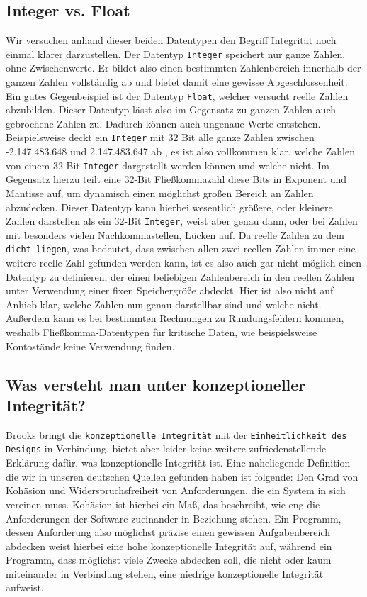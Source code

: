 \documentclass[a4paper, ngerman, 12pt, usenames, dvipsnames]{article}
\begin{document}
\subsection{Integer vs. Float}
Wir versuchen anhand dieser beiden Datentypen den Begriff Integrität noch einmal klarer darzustellen. Der Datentyp \texttt{Integer} speichert nur ganze Zahlen, ohne Zwischenwerte. Er bildet also einen bestimmten Zahlenbereich innerhalb der ganzen Zahlen vollständig ab und bietet damit eine gewisse Abgeschlossenheit. Ein gutes Gegenbeispiel ist der Datentyp \texttt{Float}, welcher versucht reelle Zahlen abzubilden. Dieser Datentyp lässt also im Gegensatz zu ganzen Zahlen auch gebrochene Zahlen zu. Dadurch können auch ungenaue Werte entstehen. Beispielsweise deckt ein \texttt{Integer} mit 32 Bit alle ganze Zahlen zwischen -2.147.483.648 und 2.147.483.647 ab \cite{dewiki:integer}, es ist also vollkommen klar, welche Zahlen von einem 32-Bit \texttt{Integer} dargestellt werden können und welche nicht. Im Gegensatz hierzu teilt eine 32-Bit Fließkommazahl diese Bits in Exponent und Mantisse auf, um dynamisch einen möglichst großen Bereich an Zahlen abzudecken. Dieser Datentyp kann hierbei wesentlich größere, oder kleinere Zahlen darstellen als ein 32-Bit \texttt{Integer}, weist aber genau dann, oder bei Zahlen mit besonders vielen Nachkommastellen, Lücken auf. \cite{dewiki:float} Da reelle Zahlen zu dem \texttt{dicht liegen}, was bedeutet, dass zwischen allen zwei reellen Zahlen immer eine weitere reelle Zahl gefunden werden kann, ist es also auch gar nicht möglich einen Datentyp zu definieren, der einen beliebigen Zahlenbereich in den reellen Zahlen unter Verwendung einer fixen Speichergröße abdeckt. Hier ist also nicht auf Anhieb klar, welche Zahlen nun genau darstellbar sind und welche nicht. Außerdem kann es bei bestimmten Rechnungen zu Rundungsfehlern kommen, weshalb Fließkomma-Datentypen für kritische Daten, wie beispielsweise Kontostände keine Verwendung finden.

\subsection{Was versteht man unter konzeptioneller Integrität?}
Brooks bringt die \texttt{konzeptionelle Integrität} mit der \texttt{Einheitlichkeit des Designs} in Verbindung, bietet aber leider keine weitere zufriedenstellende Erklärung
dafür, was konzeptionelle Integrität ist. 
Eine naheliegende Definition die wir in unseren deutschen Quellen gefunden haben ist folgende:
Den Grad von Kohäsion und Widerspruchsfreiheit von Anforderungen, die ein System in sich vereinen muss.
Kohäsion ist hierbei ein Maß, das beschreibt, wie eng die Anforderungen der Software zueinander in Beziehung stehen. Ein Programm, dessen Anforderung also möglichst präzise einen gewissen Aufgabenbereich abdecken weist hierbei eine hohe konzeptionelle Integrität auf, während ein Programm, dass möglichst viele Zwecke abdecken soll, die nicht oder kaum miteinander in Verbindung stehen, eine niedrige konzeptionelle Integrität aufweist.
\end{document}
